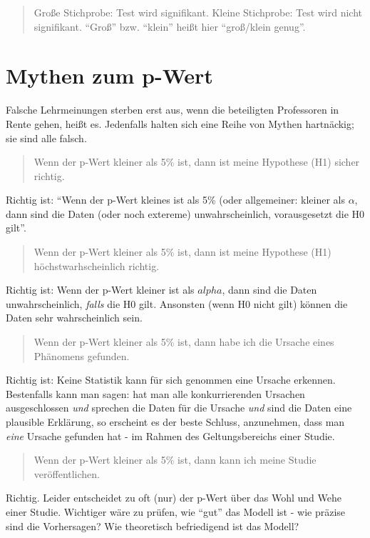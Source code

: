 \documentclass[12pt,ngerman,]{book}
\begin{document}
\begin{quote}
Große Stichprobe: Test wird signifikant. Kleine Stichprobe: Test wird
nicht signifikant. ``Groß'' bzw. ``klein'' heißt hier ``groß/klein
genug''.
\end{quote}

\section{Mythen zum p-Wert}\label{mythen-zum-p-wert}

Falsche Lehrmeinungen sterben erst aus, wenn die beteiligten Professoren
in Rente gehen, heißt es. Jedenfalls halten sich eine Reihe von Mythen
hartnäckig; sie sind alle falsch.

\begin{quote}
Wenn der p-Wert kleiner als 5\% ist, dann ist meine Hypothese (H1)
sicher richtig.
\end{quote}

Richtig ist: ``Wenn der p-Wert kleines ist als 5\% (oder allgemeiner:
kleiner als \(\alpha\), dann sind die Daten (oder noch extereme)
unwahrscheinlich, vorausgesetzt die H0 gilt''.

\begin{quote}
Wenn der p-Wert kleiner als 5\% ist, dann ist meine Hypothese (H1)
höchstwarhscheinlich richtig.
\end{quote}

Richtig ist: Wenn der p-Wert kleiner ist als \(alpha\), dann sind die
Daten unwahrscheinlich, \emph{falls} die H0 gilt. Ansonsten (wenn H0
nicht gilt) können die Daten sehr wahrscheinlich sein.

\begin{quote}
Wenn der p-Wert kleiner als 5\% ist, dann habe ich die Ursache eines
Phänomens gefunden.
\end{quote}

Richtig ist: Keine Statistik kann für sich genommen eine Ursache
erkennen. Bestenfalls kann man sagen: hat man alle konkurrierenden
Ursachen ausgeschlossen \emph{und} sprechen die Daten für die Ursache
\emph{und} sind die Daten eine plausible Erklärung, so erscheint es der
beste Schluss, anzunehmen, dass man \emph{eine} Ursache gefunden hat -
im Rahmen des Geltungsbereichs einer Studie.

\begin{quote}
Wenn der p-Wert kleiner als 5\% ist, dann kann ich meine Studie
veröffentlichen.
\end{quote}

Richtig. Leider entscheidet zu oft (nur) der p-Wert über das Wohl und
Wehe einer Studie. Wichtiger wäre zu prüfen, wie ``gut'' das Modell ist
- wie präzise sind die Vorhersagen? Wie theoretisch befriedigend ist das
Modell?
\end{document}
